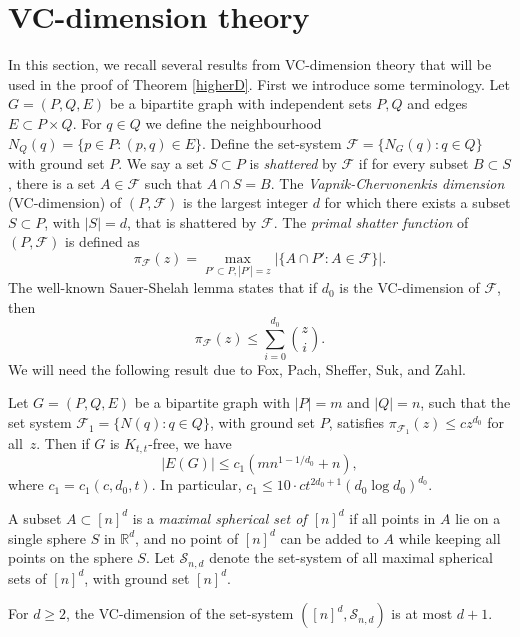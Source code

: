 \section{VC-dimension theory}\label{secvc}
In this section, we recall several results from VC-dimension theory that will be used in the proof of Theorem \ref{higherD}.   First we introduce some terminology. 
%
%
%
%
%
Let $G = (P,Q,E)$ be a bipartite graph with independent sets $P,Q$ and edges $E \subset P \times Q$. For $q \in Q$ we define the neighbourhood $N_Q(q) = \{ p \in P \colon (p,q) \in E\}$. Define the set-system $\mathcal{F} = \{ N_G(q) \colon q \in Q\}$ with ground set $P$. We say a set $S \subset P$ is \emph{shattered} by $\mathcal{F}$ if for every subset $B \subset S$, there is a set $A \in \mathcal{F}$ such that $A \cap S = B$. The \emph{Vapnik-Chervonenkis dimension} (VC-dimension) of $(P,\mathcal{F})$ is the largest integer $d$ for which there exists a subset $S \subset P$, with $|S| = d$, that is shattered by $\mathcal{F}$. 
%
The \emph{primal shatter function} of $(P,\mathcal{F})$ is defined as
\[ \pi_{\mathcal{F}}(z) = \max_{P'\subset P, |P'| = z} | \{ A \cap P' \colon A \in \mathcal{F} \}|. \]
%
\noindent The well-known Sauer-Shelah lemma \cite{sauer,shelah} states that if $d_0$ is the VC-dimension of $\mathcal{F}$, then 
%
\begin{equation}\label{sauer} \pi_{\mathcal{F}}(z)  \leq \sum_{i=0}^{d_0} \binom{z}{i}. \end{equation}
%
%
\noindent We will need the following result due to Fox, Pach, Sheffer, Suk, and Zahl.
%
%
\begin{theorem}\label{bipVC}
%
Let $G = (P, Q, E)$ be a bipartite graph with $|P| = m$ and $|Q| = n$, such that the set
system $\mathcal{F}_1 = \{N(q) \colon q \in Q\}$, with ground set $P$, satisfies $\pi_{\mathcal{F}_1}(z) \leq cz^{d_0}$ for all~$z$. Then if $G$ is $K_{t,t}$-free, we have 
%
\[ |E(G)| \leq c_1(mn^{1-1/d_0} + n), \]
where $c_1 = c_1(c, d_0, t)$.  In particular, $c_1 \leq 10\cdot ct^{2d_0 + 1}(d_0\log d_0)^{d_0}.$
%
\end{theorem}
%
%
%
%
A subset $A \subset [n]^d$ is a \emph{maximal spherical set of $[n]^d$} if all points in $A$ lie on a single sphere $S$ in $\mathbb{R}^d$, and no point of $[n]^d$ can be added to $A$ while keeping all points on the sphere $S$. Let $\mathcal{S}_{n,d}$ denote the set-system of all maximal spherical sets of $[n]^d$, with ground set $[n]^d$.  
%
%
\begin{lemma}\label{sphereVC}
%
For $d\geq 2$, the VC-dimension of the set-system $([n]^d,\mathcal{S}_{n,d})$ is at most $d+1$. 
%
\end{lemma}
